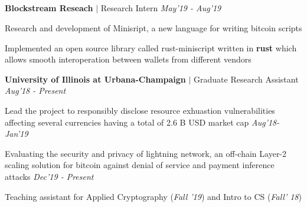 \documentclass[margin,line]{resume}
\begin{document}
\begin{resume}
\vspace{-5mm}
\section{}

\textbf{Blockstream Reseach} $\mid$ Research Intern 
\hfill \textit{May'19 - Aug'19}\\
\vspace{-3.5mm}
\begin{list2}
\item Research and development of Minisript, a new language for writing bitcoin scripts
\item Implemented an open source library called rust-miniscript written in \textbf{rust} which allows smooth interoperation between wallets from different vendors
\end{list2}
\vspace{-3.5mm}
\textbf{University of Illinois at Urbana-Champaign} $\mid$ Graduate Research Assistant 
\hfill \textit{Aug'18 - Present}\\
\vspace{-3.5mm}
\begin{list2}
\item  Lead the project to responsibly disclose resource exhuastion vulnerabilities affecting several currencies having a total of 2.6 B USD market cap \hfill \textit{Aug'18-Jan'19}
\item Evaluating the security and privacy of lightning network, an off-chain Layer-2 scaling solution for bitcoin against denial of service and payment inference attacks \hfill \textit{Dec'19 - Present}
\item Teaching assistant for Applied Cryptography (\textit{Fall '19}) and Intro to CS (\textit{Fall' 18}) \hfill 
\end{list2}

\vspace{-2mm}


\end{resume}
\end{document}
